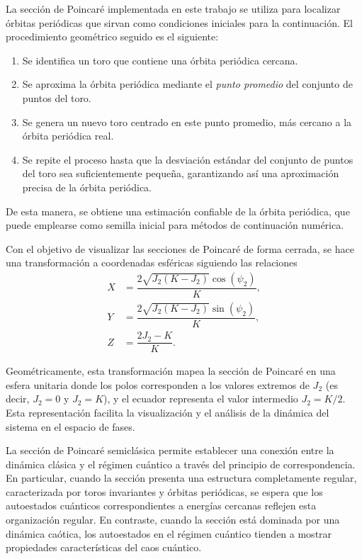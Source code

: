 La sección de Poincaré implementada en este trabajo se utiliza para localizar órbitas periódicas que sirvan como condiciones iniciales
para la continuación. El procedimiento geométrico seguido es el siguiente:

\begin{enumerate}
    \item Se identifica un toro que contiene una órbita periódica cercana.
    \item Se aproxima la órbita periódica mediante el \emph{punto promedio} del conjunto de puntos del toro.
    \item Se genera un nuevo toro centrado en este punto promedio, más cercano a la órbita periódica real.
    \item Se repite el proceso hasta que la desviación estándar del conjunto de puntos del toro sea suficientemente pequeña,
          garantizando así una aproximación precisa de la órbita periódica.
\end{enumerate}

De esta manera, se obtiene una estimación confiable de la órbita periódica, que puede emplearse como semilla inicial
para métodos de continuación numérica.

Con el objetivo de visualizar las secciones de Poincaré de forma cerrada, se hace una transformación a
coordenadas esféricas siguiendo las relaciones
\begin{equation}
    \begin{aligned}
        X & = \dfrac{2 \sqrt{J_2 (K - J_2)} \cos(\psi_2)}{K}, \\
        Y & = \dfrac{2 \sqrt{J_2 (K - J_2)} \sin(\psi_2)}{K}, \\
        Z & = \dfrac{2 J_2 - K}{K}.
    \end{aligned}
    \label{eq:spherical_coordinates}
\end{equation}

Geométricamente, esta transformación mapea la sección de Poincaré en una esfera unitaria
donde los polos corresponden a los valores extremos de \(J_2\) (es decir, \(J_2 = 0\) y \(J_2 = K\)),
y el ecuador representa el valor intermedio \(J_2 = K/2\). Esta representación facilita la visualización
y el análisis de la dinámica del sistema en el espacio de fases.

La sección de Poincaré semiclásica permite establecer una conexión entre la dinámica clásica y el régimen cuántico a través del principio de correspondencia. En particular, cuando la sección presenta una estructura completamente regular, caracterizada por toros invariantes y órbitas periódicas, se espera que los autoestados cuánticos correspondientes a energías cercanas reflejen esta organización regular. En contraste, cuando la sección está dominada por una dinámica caótica, los autoestados en el régimen cuántico tienden a mostrar propiedades características del caos cuántico.

